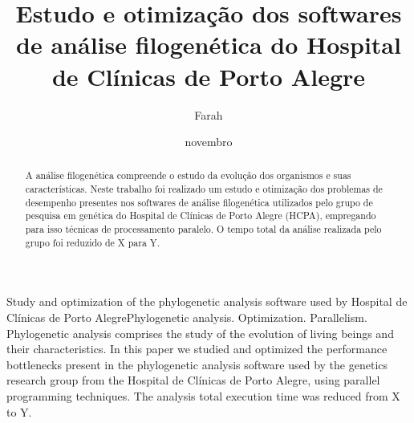 \documentclass[cic,tc]{iiufrgs}
\title{Estudo e otimização dos softwares de análise filogenética do Hospital de
Clínicas de Porto Alegre}
\author{Farah}{Alef}
\date{novembro}{2021}
\begin{document}
\maketitle



\begin{abstract}
  A análise filogenética compreende o estudo da evolução dos organismos e suas
  características. Neste trabalho foi realizado um estudo e otimização dos
  problemas de desempenho presentes nos softwares de análise filogenética
  utilizados pelo grupo de pesquisa em genética do Hospital de Clínicas de
  Porto Alegre (HCPA), empregando para isso técnicas de processamento paralelo.
  O tempo total da análise realizada pelo grupo foi reduzido de X para Y. %
\end{abstract}

\begin{englishabstract}{Study and optimization of the phylogenetic analysis software used by Hospital de Clínicas de Porto Alegre}{Phylogenetic analysis. Optimization. Parallelism.} Phylogenetic analysis comprises the study of the evolution of living beings and their characteristics. In this paper we studied and optimized the performance bottlenecks present in the phylogenetic analysis software used by the genetics research group from the Hospital de Clínicas de Porto Alegre, using parallel programming techniques. The analysis total execution time was reduced from X to Y. %
\end{englishabstract}
\end{document}
